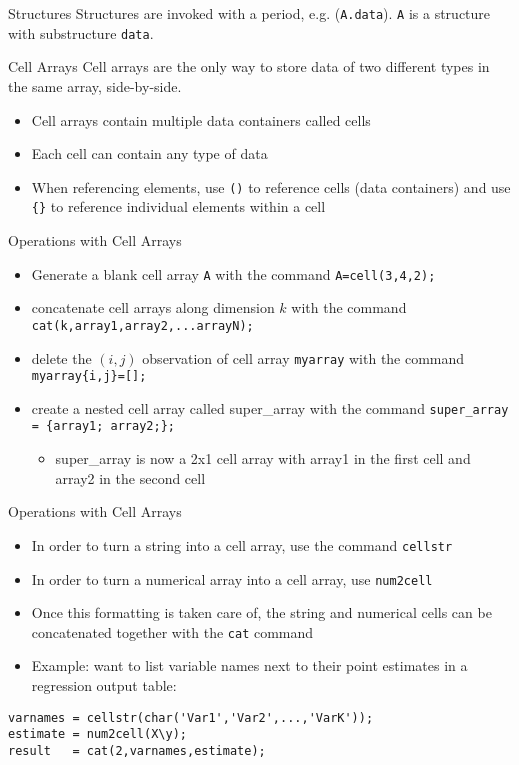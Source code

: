 \documentclass[english,xcolor=dvipsnames]{beamer}
\begin{document}
\begin{frame}{Structures}
Structures are invoked with a period, e.g. (\texttt{A.data}). \texttt{A}
is a structure with substructure \texttt{data}.
\end{frame}


\begin{frame}{Cell Arrays}
Cell arrays are the only way to store data of two different types
in the same array, side-by-side.
\begin{itemize}
\item Cell arrays contain multiple data containers called cells
\item Each cell can contain any type of data
\item When referencing elements, use \texttt{()} to reference cells (data
containers) and use \texttt{\{\}} to reference individual elements
within a cell
\end{itemize}
\end{frame}


\begin{frame}{Operations with Cell Arrays}
\begin{itemize}
\item Generate a blank cell array \texttt{A} with the command \texttt{A=cell(3,4,2);}
\item concatenate cell arrays along dimension $k$ with the command \texttt{cat(k,array1,array2,...arrayN);}
\item delete the $(i,j)$ observation of cell array \texttt{myarray} with
the command \texttt{myarray\{i,j\}={[}{]};}
\item create a nested cell array called super\_array with the command \texttt{super\_array
= \{array1; array2;\};}
\begin{itemize}
\item super\_array is now a 2x1 cell array with array1 in the first cell
and array2 in the second cell
\end{itemize}
\end{itemize}
\end{frame}


\begin{frame}[fragile]{Operations with Cell Arrays}
\begin{itemize}
\item In order to turn a string into a cell array, use the command \texttt{cellstr}
\item In order to turn a numerical array into a cell array, use \texttt{num2cell}
\item Once this formatting is taken care of, the string and numerical cells
can be concatenated together with the \texttt{cat} command
\item Example: want to list variable names next to their point estimates
in a regression output table:
\end{itemize}
\begin{lstlisting}
varnames = cellstr(char('Var1','Var2',...,'VarK'));
estimate = num2cell(X\y);
result   = cat(2,varnames,estimate);
\end{lstlisting}
\end{frame}
\end{document}
